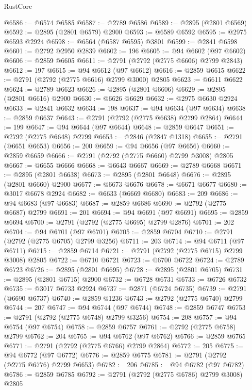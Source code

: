 \begin{lexlean}{RustCore}
\begin{coremodule}
@6586 := @6574 @6585
@6587 := @2789 @6586
@6589 := @2895 (@2801 @6569)
@6592 := @2895 (@2801 @6579) @2900
@6593 := @6589 @6592
@6595 := @2975 @6593 @2924
@6598 := @6564 (@6587 @6595) @3801
@6599 := @2841 @6598
@6601 := @2792 @2950 @2839
@6602 := 196
@6605 := @94 @6602 (@97 @6602)
@6606 := @2859 @6605
@6611 := @2791 (@2792 (@2775 @6606) @2799 @2843)
@6612 := 197
@6615 := @94 @6612 (@97 @6612)
@6616 := @2859 @6615
@6622 := @2791 (@2792 (@2775 @6616) @2799 @3000) @2805
@6623 := @6611 @6622
@6624 := @2789 @6623
@6626 := @2895 (@2801 @6606)
@6629 := @2895 (@2801 @6616) @2900
@6630 := @6626 @6629
@6632 := @2975 @6630 @2924
@6633 := @2841 @6632
@6634 := 198
@6637 := @94 @6634 (@97 @6634)
@6638 := @2859 @6637
@6643 := @2791 (@2792 (@2775 @6638) @2799 @2864)
@6644 := 199
@6647 := @94 @6644 (@97 @6644)
@6648 := @2859 @6647
@6651 := @2792 (@2775 @6648) @2799
@6653 := @2846 (@2847 @1318)
@6655 := @2791 (@6651 @6653)
@6656 := 200
@6659 := @94 @6656 (@97 @6656)
@6660 := @2859 @6659
@6666 := @2791 (@2792 (@2775 @6660) @2799 @3008) @2805
@6667 := @6655 @6666
@6668 := @6643 @6667
@6669 := @2789 @6668
@6671 := @2895 (@2801 @6638)
@6673 := @2895 (@2801 @6648)
@6676 := @2895 (@2801 @6660) @2900
@6677 := @6673 @6676
@6678 := @6671 @6677
@6680 := @3017 @6678 @2924
@6682 := @6633 (@6669 @6680)
@6683 := 209
@6686 := @94 @6683 (@97 @6683)
@6687 := @2859 @6686
@6690 := @2792 (@2775 @6687) @2799
@6691 := 201
@6694 := @94 @6691 (@97 @6691)
@6695 := @2859 @6694
@6700 := @2791 (@2792 (@2775 @6695) @2799 @2876)
@6701 := 202
@6704 := @94 @6701 (@97 @6701)
@6705 := @2859 @6704
@6710 := @2791 (@2792 (@2775 @6705) @2799 @3256)
@6711 := 203
@6714 := @94 @6711 (@97 @6711)
@6715 := @2859 @6714
@6721 := @2791 (@2792 (@2775 @6715) @2799 @3008) @2805
@6722 := @6710 @6721
@6723 := @6700 @6722
@6724 := @2789 @6723
@6726 := @2895 (@2801 @6695)
@6728 := @2895 (@2801 @6705)
@6731 := @2895 (@2801 @6715) @2900
@6732 := @6728 @6731
@6733 := @6726 @6732
@6735 := @3017 @6733 @2924
@6737 := @2871 (@6724 @6735)
@6739 := @2791 (@6690 @6737)
@6740 := @2859 @1236
@6743 := @2792 (@2775 @6740) @2799
@6744 := 207
@6747 := @94 @6744 (@97 @6744)
@6748 := @2859 @6747
@6753 := @2791 (@2792 (@2775 @6748) @2799 @3256)
@6754 := 208
@6757 := @94 @6754 (@97 @6754)
@6758 := @2859 @6757
@6761 := @2792 (@2775 @6758) @2799
@6762 := 204
@6765 := @94 @6762 (@97 @6762)
@6766 := @2859 @6765
@6771 := @2791 (@2792 (@2775 @6766) @2799 @2864)
@6772 := 205
@6775 := @94 @6772 (@97 @6772)
@6776 := @2859 @6775
@6781 := @2791 (@2792 (@2775 @6776) @2799 @6653)
@6782 := 206
@6785 := @94 @6782 (@97 @6782)
@6786 := @2859 @6785
@6792 := @2791 (@2792 (@2775 @6786) @2799 @3008) @2805

\end{coremodule}
\end{lexlean}
